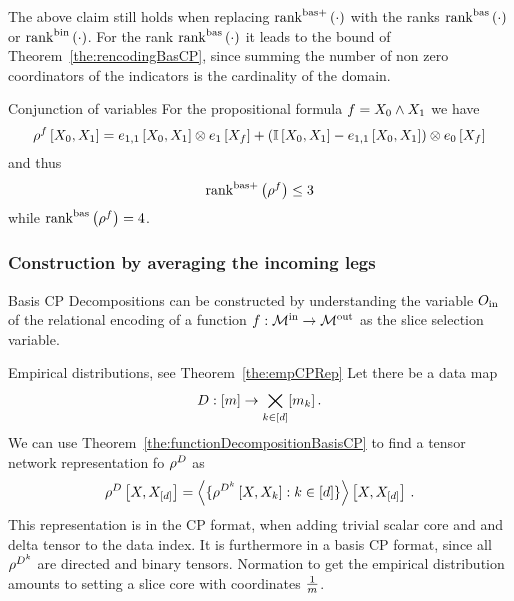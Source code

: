 The above claim still holds when replacing $\mathrm{rank}^{\mathrm{bas+}}\left(\cdot\right)$ with the ranks $\mathrm{rank}^{\mathrm{bas}}\left(\cdot\right)$ or $\mathrm{rank}^{\mathrm{bin}}\left(\cdot\right)$.
For the rank $\mathrm{rank}^{\mathrm{bas}}\left(\cdot\right)$ it leads to the bound of Theorem~\ref{the:rencodingBasCP}, since summing the number of non zero coordinators of the indicators is the cardinality of the domain.

\begin{example}{Conjunction of variables}
	For the propositional formula $f = X_{0} \land X_{1}$ we have
		\[ \rho^{f}\left[X_{0},X_{1}\right]
		 = e_{1,1}\left[X_{0},X_{1}\right] \otimes e_{1}\left[X_{f}\right]
		  +  (\mathbb{I}\left[X_{0},X_{1}\right] - e_{1,1}\left[X_{0},X_{1}\right]) \otimes e_{0}\left[X_{f}\right]  \]
	and thus 
		\[ \mathrm{rank}^{\mathrm{bas+}}\left(\rho^{f}\right) \leq 3\]
	while $\mathrm{rank}^{\mathrm{bas}}\left(\rho^{f}\right) = 4$.
\end{example}




\subsubsection{Construction by averaging the incoming legs}

Basis CP Decompositions can be constructed by understanding the variable $O_{\mathrm{in}}$ of the relational encoding of a function $f:\mathcal{M}^{\mathrm{in}} \rightarrow \mathcal{M}^{\mathrm{out}}$ as the slice selection variable.

\begin{example}{Empirical distributions, see Theorem~\ref{the:empCPRep}}
	Let there be a data map 
		\[ D : [m] \rightarrow \bigtimes_{k\in[d]}[m_{k}] \, . \]
	We can use Theorem~\ref{the:functionDecompositionBasisCP} to find a tensor network representation fo $\rho^{D}$ as
	\begin{align*}
		\rho^{D}\left[X,X_{[d]}\right]  
		= \left\langle 
		\{\rho^{D^{k}}\left[X,X_{k}\right] : k\in[d] \} 
		\right\rangle \left[ X,X_{[d]} \right] \, . 
	\end{align*}
	This representation is in the CP format, when adding trivial scalar core and and delta tensor to the data index.
	It is furthermore in a basis CP format, since all $\rho^{D^{k}}$ are directed and binary tensors.
	Normation to get the empirical distribution amounts to setting a slice core with coordinates $\frac{1}{m}$.
\end{example}





